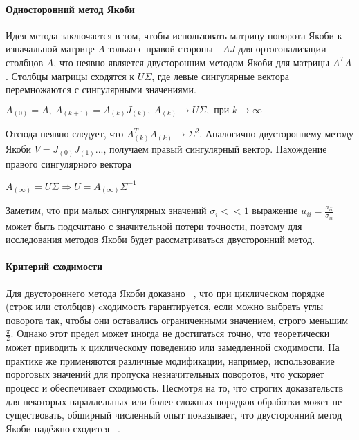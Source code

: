 \paragraph{Односторонний метод Якоби}
Идея метода заключается в том, чтобы использовать матрицу поворота Якоби к изначальной матрице $A$ только с правой стороны - $AJ$ для ортогонализации столбцов $A$, что неявно является двусторонним методом Якоби для матрицы $A^TA$.
Столбцы матрицы сходятся к $U\Sigma$, где левые сингулярные вектора перемножаются с сингулярными значениями.
\begin{center}
     $A_{(0)}=A,\ A_{(k+1)} = A_{(k)}J_{(k)},\ A_{(k)} \longrightarrow U\Sigma, \text{ при } k\to\infty$
 \end{center}
 Отсюда неявно следует, что $A^T_{(k)}A_{(k)} \to \Sigma^2$. Аналогично двустороннему методу Якоби $V = J_{(0)}J_{(1)}...$, получаем правый сингулярный вектор. Нахождение правого сингулярного вектора 
 \begin{center}
     $A_{(\infty)} = U\Sigma \Rightarrow U = A_{(\infty)}\Sigma^{-1}$
 \end{center}
 Заметим, что при малых сингулярных значений $\sigma_i<<1$ выражение $u_{ii} = \frac{a_{ii}}{\sigma_{ii}}$ может быть подсчитано с значительной потери точности, поэтому для исследования методов Якоби будет рассматриваться двусторонний метод.

\paragraph{Критерий сходимости}
Для двустороннего метода Якоби доказано ~\cite{Forsythe1960}, что при циклическом порядке (строк или столбцов) cходимость гарантируется, если можно выбрать углы поворота так, чтобы они оставались ограниченными значением, строго меньшим $\frac{\pi}{2}$. Однако этот предел может иногда не достигаться точно, что теоретически может приводить к циклическому поведению или замедленной сходимости. На практике же применяются различные модификации, например, использование пороговых значений для пропуска незначительных поворотов, что ускоряет процесс и обеспечивает сходимость. Несмотря на то, что строгих доказательств для некоторых параллельных или более сложных порядков обработки может не существовать, обширный численный опыт показывает, что двусторонний метод Якоби надёжно сходится ~\cite{Dongarra2018}.


